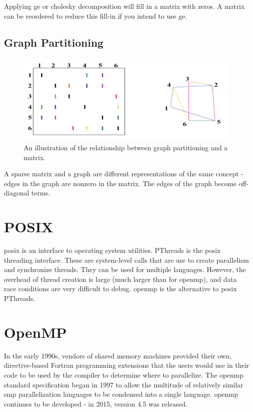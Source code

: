 \documentclass[10pt]{article}
\begin{document}
\begin{flushleft}
Applying \gls{ge} or cholesky decomposition will fill in a matrix with zeros. A matrix can be reordered to reduce this fill-in if you intend to use \gls{ge}.

\subsection{Graph Partitioning}

\begin{figure}[H]
\centering
\includegraphics[width=0.75\linewidth]{figures/graph-partitioning.pdf}
\caption{An illustration of the relationship between graph partitioning and a matrix.}
\end{figure}

A sparse matrix and a graph are different representations of the same concept - edges in the graph are nonzero in the matrix. The edges of the graph become off-diagonal terms.

\section{POSIX}

\gls{posix} is an interface to operating system utilities. PThreads is the \gls{posix} threading interface. These are system-level calls that are use to create parallelism and synchronize threads. They can be used for multiple languages. However, the overhead of thread creation is large (much larger than for \gls{openmp}), and data race conditions are very difficult to debug. \gls{openmp} is the alternative to \gls{posix} PThreads.
 
\section{OpenMP}

In the early 1990s, vendors of shared memory machines provided their own, directive-based Fortran programming extensions that the users would use in their code to be used by the compiler to determine where to parallelize. The \gls{openmp} standard specification began in 1997 to allow the multitude of relatively similar \gls{smp} parallelization languages to be condensed into a single language. \gls{openmp} continues to be developed - in 2015, version 4.5 was released.


\end{flushleft}
\end{document}
